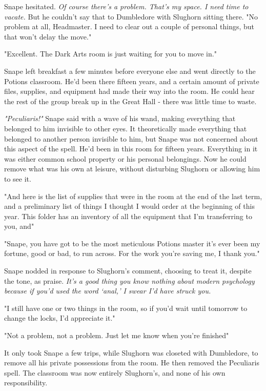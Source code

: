 Snape hesitated. \emph{Of course there's a problem. That's my space. I need time to vacate.} But he couldn't say that to Dumbledore with Slughorn sitting there. "No problem at all, Headmaster. I need to clear out a couple of personal things, but that won't delay the move."

"Excellent. The Dark Arts room is just waiting for you to move in."

Snape left breakfast a few minutes before everyone else and went directly to the Potions classroom. He'd been there fifteen years, and a certain amount of private files, supplies, and equipment had made their way into the room. He could hear the rest of the group break up in the Great Hall - there was little time to waste.

\emph{"Peculiaris!"} Snape said with a wave of his wand, making everything that belonged to him invisible to other eyes. It theoretically made everything that belonged to another person invisible to him, but Snape was not concerned about this aspect of the spell. He'd been in this room for fifteen years. Everything in it was either common school property or his personal belongings. Now he could remove what was his own at leisure, without disturbing Slughorn or allowing him to see it.

\sbreak

"And here is the list of supplies that were in the room at the end of the last term, and a preliminary list of things I thought I would order at the beginning of this year. This folder has an inventory of all the equipment that I'm transferring to you, and{\el}"

"Snape, you have got to be the most meticulous Potions master it's ever been my fortune, good or bad, to run across. For the work you're saving me, I thank you."

Snape nodded in response to Slughorn's comment, choosing to treat it, despite the tone, as praise. \emph{It's a good thing you know nothing about modern psychology because if you'd used the word `anal,' I swear I'd have struck you.}

"I still have one or two things in the room, so if you'd wait until tomorrow to change the locks, I'd appreciate it."

"Not a problem, not a problem. Just let me know when you're finished{\el}"

It only took Snape a few trips, while Slughorn was closeted with Dumbledore, to remove all his private possessions from the room. He then removed the Peculiaris spell. The classroom was now entirely Slughorn's, and none of his own responsibility.

